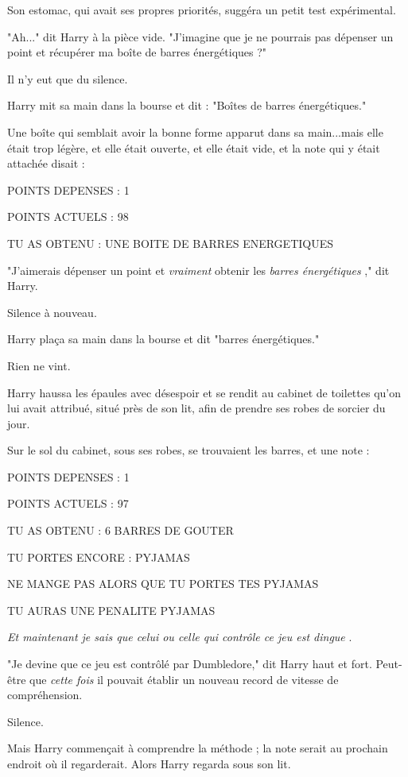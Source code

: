 Son estomac, qui avait ses propres priorités, suggéra un petit test expérimental.

"Ah..." dit Harry à la pièce vide. "J'imagine que je ne pourrais pas dépenser un point et récupérer ma boîte de barres énergétiques ?"

Il n'y eut que du silence.

Harry mit sa main dans la bourse et dit : "Boîtes de barres énergétiques."

Une boîte qui semblait avoir la bonne forme apparut dans sa main...mais elle était trop légère, et elle était ouverte, et elle était vide, et la note qui y était attachée disait :

POINTS DEPENSES : 1

POINTS ACTUELS : 98

TU AS OBTENU : UNE BOITE DE BARRES ENERGETIQUES

"J'aimerais dépenser un point et \emph{vraiment}  obtenir les \emph{barres énergétiques} ," dit Harry.

Silence à nouveau.

Harry plaça sa main dans la bourse et dit "barres énergétiques."

Rien ne vint.

Harry haussa les épaules avec désespoir et se rendit au cabinet de toilettes qu'on lui avait attribué, situé près de son lit, afin de prendre ses robes de sorcier du jour.

Sur le sol du cabinet, sous ses robes, se trouvaient les barres, et une note :

POINTS DEPENSES : 1

POINTS ACTUELS : 97

TU AS OBTENU : 6 BARRES DE GOUTER

TU PORTES ENCORE : PYJAMAS

NE MANGE PAS ALORS QUE TU PORTES TES PYJAMAS

TU AURAS UNE PENALITE PYJAMAS

\emph{Et maintenant je sais que celui ou celle qui contrôle ce jeu est dingue} .

"Je devine que ce jeu est contrôlé par Dumbledore," dit Harry haut et fort. Peut-être que \emph{cette fois}  il pouvait établir un nouveau record de vitesse de compréhension.

Silence.

Mais Harry commençait à comprendre la méthode ; la note serait au prochain endroit où il regarderait. Alors Harry regarda sous son lit.


